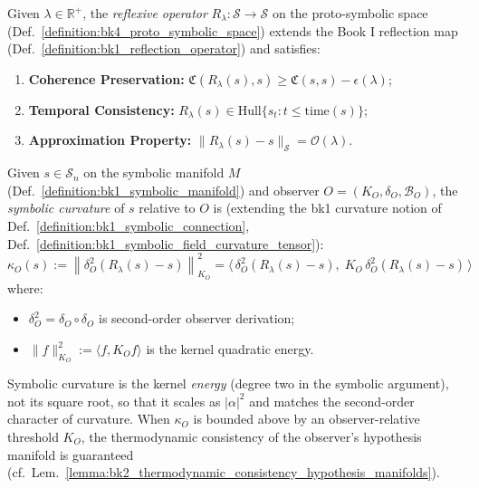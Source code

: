 \begin{definition}
\label{definition:bk4_reflexive_operator}
Given $\lambda \in \mathbb{R}^+$, the \emph{reflexive operator} $R_\lambda : \mathcal{S} \to \mathcal{S}$ on the proto-symbolic space (Def.~\ref{definition:bk4_proto_symbolic_space}) extends the Book I reflection map (Def.~\ref{definition:bk1_reflection_operator}) and satisfies:
\begin{enumerate}
    \item \textbf{Coherence Preservation:} $\mathfrak{C}(R_\lambda(s), s) \geq \mathfrak{C}(s, s) - \epsilon(\lambda)$;
    \item \textbf{Temporal Consistency:} $R_\lambda(s) \in \text{Hull}\{s_t : t \leq \mathrm{time}(s)\}$;
    \item \textbf{Approximation Property:} $\| R_\lambda(s) - s \|_{\mathcal{S}} = \mathcal{O}(\lambda)$.
\end{enumerate}
\end{definition}

\begin{definition}
\label{definition:bk4_symbolic_curvature}
Given $s \in \mathcal{S}_n$ on the symbolic manifold $M$ (Def.~\ref{definition:bk1_symbolic_manifold}) and observer $O = (K_O, \delta_O, \mathcal{B}_O)$, the \emph{symbolic curvature} of $s$ relative to $O$ is (extending the bk1 curvature notion of Def.~\ref{definition:bk1_symbolic_connection}, Def.~\ref{definition:bk1_symbolic_field_curvature_tensor}):
\[
\kappa_O(s) := \left\| \delta_O^2(R_\lambda(s) - s) \right\|_{K_O}^2
= \big\langle\, \delta_O^2(R_\lambda(s) - s),\; K_O\,\delta_O^2(R_\lambda(s) - s) \,\big\rangle
\]
where:
\begin{itemize}
    \item $\delta_O^2 = \delta_O \circ \delta_O$ is second-order observer derivation;
    \item $\|f\|_{K_O}^2 := \langle f, K_O f \rangle$ is the kernel quadratic energy.
\end{itemize}
Symbolic curvature is the kernel \emph{energy} (degree two in the symbolic argument), not its square root, so that it scales as $|\alpha|^2$ and matches the second-order character of curvature.
When $\kappa_O$ is bounded above by an observer-relative threshold $K_O$, the thermodynamic consistency of the observer's hypothesis manifold is guaranteed (cf.~Lem.~\ref{lemma:bk2_thermodynamic_consistency_hypothesis_manifolds}).
\end{definition}

